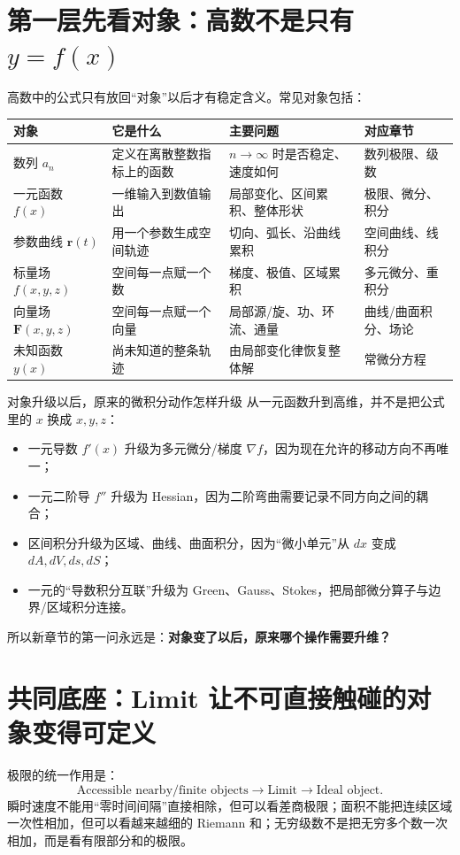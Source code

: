 \documentclass[11pt,a4paper,openany]{ctexbook}
\newcommand{\key}[1]{\textbf{\color{deep}#1}}
\begin{document}
\section{第一层先看对象：高数不是只有 $y=f(x)$}
高数中的公式只有放回“对象”以后才有稳定含义。常见对象包括：
\begin{longtable}{L{3.1cm}L{4.1cm}L{4.3cm}L{\dimexpr\linewidth-11.67cm\relax}}
\toprule
\textbf{对象} & \textbf{它是什么} & \textbf{主要问题} & \textbf{对应章节}\\
\midrule
数列 $a_n$ & 定义在离散整数指标上的函数 & $n\to\infty$ 时是否稳定、速度如何 & 数列极限、级数\\
一元函数 $f(x)$ & 一维输入到数值输出 & 局部变化、区间累积、整体形状 & 极限、微分、积分\\
参数曲线 $\bm r(t)$ & 用一个参数生成空间轨迹 & 切向、弧长、沿曲线累积 & 空间曲线、线积分\\
标量场 $f(x,y,z)$ & 空间每一点赋一个数 & 梯度、极值、区域累积 & 多元微分、重积分\\
向量场 $\bm F(x,y,z)$ & 空间每一点赋一个向量 & 局部源/旋、功、环流、通量 & 曲线/曲面积分、场论\\
未知函数 $y(x)$ & 尚未知道的整条轨迹 & 由局部变化律恢复整体解 & 常微分方程\\
\bottomrule
\end{longtable}

\begin{corebox}{对象升级以后，原来的微积分动作怎样升级}
从一元函数升到高维，并不是把公式里的 $x$ 换成 $x,y,z$：
\begin{itemize}
  \item 一元导数 $f'(x)$ 升级为多元微分/梯度 $\nabla f$，因为现在允许的移动方向不再唯一；
  \item 一元二阶导 $f''$ 升级为 Hessian，因为二阶弯曲需要记录不同方向之间的耦合；
  \item 区间积分升级为区域、曲线、曲面积分，因为“微小单元”从 $dx$ 变成 $dA,dV,ds,dS$；
  \item 一元的“导数积分互联”升级为 Green、Gauss、Stokes，把局部微分算子与边界/区域积分连接。
\end{itemize}
所以新章节的第一问永远是：\key{对象变了以后，原来哪个操作需要升维？}
\end{corebox}

\section{共同底座：Limit 让不可直接触碰的对象变得可定义}
极限的统一作用是：
\[
\boxed{\text{Accessible nearby/finite objects}\to\text{Limit}\to\text{Ideal object}}.
\]
瞬时速度不能用“零时间间隔”直接相除，但可以看差商极限；面积不能把连续区域一次性相加，但可以看越来越细的 Riemann 和；无穷级数不是把无穷多个数一次相加，而是看有限部分和的极限。
\end{document}
